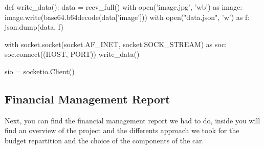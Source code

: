 \begin{appendices}
\begin{python}
def write_data():
    data = recv_full()
    with open('image.jpg', 'wb') as image:
        image.write(base64.b64decode(data['image']))
    with open("data.json", 'w') as f:
        json.dump(data, f)



with socket.socket(socket.AF_INET, socket.SOCK_STREAM) as soc:
    soc.connect((HOST, PORT))
    write_data()



sio = socketio.Client()
\end{python}

\subsection{Financial Management Report}
Next, you can find the financial management report we had to do, inside you will find an overview of the project and the differents approach we took for the budget repartition and the choice of the components of the car.


\end{appendices}